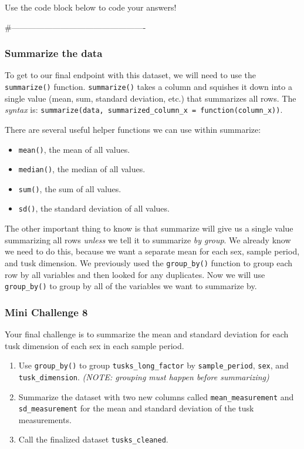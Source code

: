 \documentclass[
]{article}
\providecommand{\tightlist}{%
  \setlength{\itemsep}{0pt}\setlength{\parskip}{0pt}}
\begin{document}
Use the code block below to code your answers!

\#-------------------------------------------------

\subsubsection{Summarize the data}\label{summarize-the-data}

To get to our final endpoint with this dataset, we will need to use the
\texttt{summarize()} function. \texttt{summarize()} takes a column and
squishes it down into a single value (mean, sum, standard deviation,
etc.) that summarizes all rows. The \emph{syntax} is:
\texttt{summarize(data,\ summarized\_column\_x\ =\ function(column\_x))}.

There are several useful helper functions we can use within summarize:

\begin{itemize}
\tightlist
\item
  \texttt{mean()}, the mean of all values.
\item
  \texttt{median()}, the median of all values.
\item
  \texttt{sum()}, the sum of all values.
\item
  \texttt{sd()}, the standard deviation of all values.
\end{itemize}

The other important thing to know is that summarize will give us a
single value summarizing all rows \emph{unless} we tell it to summarize
\emph{by group}. We already know we need to do this, because we want a
separate mean for each sex, sample period, and tusk dimension. We
previously used the \texttt{group\_by()} function to group each row by
all variables and then looked for any duplicates. Now we will use
\texttt{group\_by()} to group by all of the variables we want to
summarize by.

\subsubsection{\texorpdfstring{\textbf{Mini Challenge
8}}{Mini Challenge 8}}\label{mini-challenge-8}

Your final challenge is to summarize the mean and standard deviation for
each tusk dimension of each sex in each sample period.

\begin{enumerate}
\def\labelenumi{\arabic{enumi}.}
\tightlist
\item
  Use \texttt{group\_by()} to group \texttt{tusks\_long\_factor} by
  \texttt{sample\_period}, \texttt{sex}, and \texttt{tusk\_dimension}.
  \emph{(NOTE: grouping must happen before summarizing)}
\item
  Summarize the dataset with two new columns called
  \texttt{mean\_measurement} and \texttt{sd\_measurement} for the mean
  and standard deviation of the tusk measurements.
\item
  Call the finalized dataset \texttt{tusks\_cleaned}.
\end{enumerate}
\end{document}
